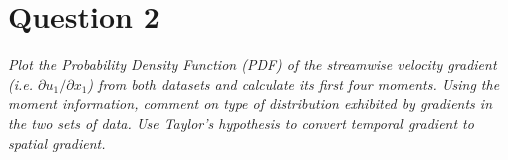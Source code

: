 \section*{Question 2}

\textit{ Plot the Probability Density Function (PDF) of the streamwise velocity gradient (i.e. $\partial u_1 / \partial x_1$) from both datasets and calculate its first four moments. Using the moment information, comment on type of distribution exhibited by gradients in the two sets of data. Use Taylor’s hypothesis to convert temporal gradient to spatial gradient.}